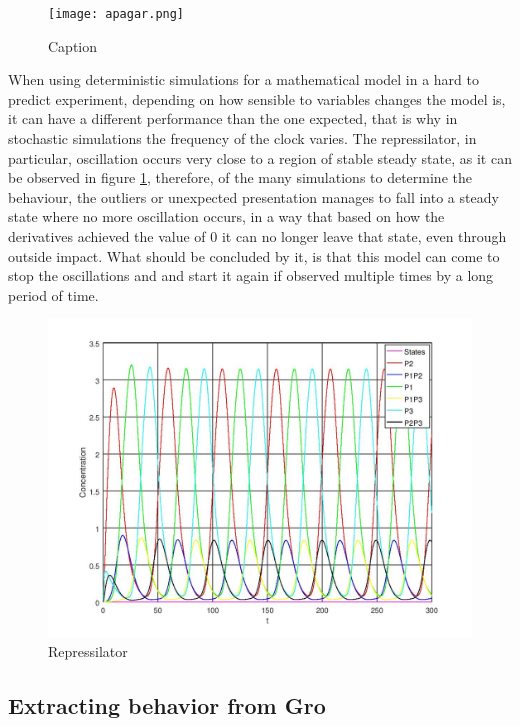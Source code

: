 \documentclass[12pt]{article}
\begin{document}
\begin{figure}[h]
    \centering
    \texttt{[image: apagar.png]}
    \caption{Caption}
    \label{fig:phase_plane_repressilator}
\end{figure}

When using deterministic simulations for a mathematical model in a hard to predict experiment, depending on how sensible to variables changes the model is, it can have a different performance than the one expected, that is why in stochastic simulations the frequency of the clock varies. The repressilator, in particular, oscillation occurs very close to a region of stable steady state, as it can be observed in figure \ref{fig:phase_plane_repressilator}, therefore, of the many simulations to determine the behaviour, the outliers or unexpected presentation manages to fall into a steady state where no more oscillation occurs, in a way that based on how the derivatives achieved the value of 0 it can no longer leave that state, even through outside impact. What should be concluded by it, is that this model can come to stop the oscillations and and start it again if observed multiple times by a long period of time.

\begin{figure}[ht]
\centering
\includegraphics[width=.5\textwidth]{repressilator.jpg}
\caption{Repressilator}
\label{fig:repressilator}
\end{figure}

\subsection{Extracting behavior from Gro}
\end{document}
